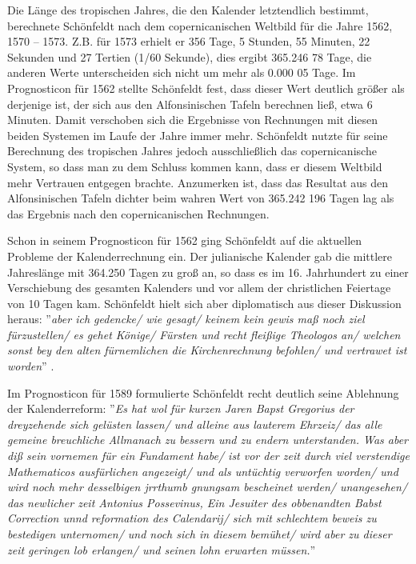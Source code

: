 \documentclass[12pt]{article}
\begin{document}
Die Länge des tropischen Jahres, die den Kalender letztendlich bestimmt, berechnete Schönfeldt nach dem copernicanischen Weltbild für die Jahre 1562, 1570 -- 1573. Z.B. für 1573 erhielt er 356 Tage, 5 Stunden, 55 Minuten, 22 Sekunden und 27 Tertien (1/60 Sekunde), dies ergibt 365.246 78 Tage, die anderen Werte unterscheiden sich  nicht um mehr als 0.000 05 Tage. Im Prognosticon für 1562 stellte Schönfeldt fest, dass dieser Wert deutlich größer als derjenige ist, der sich aus den Alfonsinischen Tafeln berechnen ließ, etwa 6 Minuten. Damit verschoben sich die Ergebnisse von Rechnungen mit diesen beiden Systemen im Laufe der Jahre immer mehr. Schönfeldt nutzte für seine Berechnung des tropischen Jahres jedoch ausschließlich das copernicanische System, so dass man zu dem Schluss kommen kann, dass er diesem Weltbild mehr Vertrauen entgegen brachte. Anzumerken ist, dass das Resultat aus den Alfonsinischen Tafeln dichter beim wahren Wert von 365.242 196 Tagen lag als das Ergebnis nach den copernicanischen Rechnungen.


Schon in seinem Prognosticon für 1562 ging Schönfeldt auf die aktuellen Probleme der Kalenderrechnung ein. Der julianische Kalender gab die mittlere Jahreslänge mit 364.250 Tagen zu groß an, so dass es im 16. Jahrhundert zu einer Verschiebung des gesamten Kalenders und vor allem der christlichen Feiertage von 10 Tagen kam. Schönfeldt hielt sich aber diplomatisch aus dieser Diskussion heraus: ''\emph{aber ich gedencke/ wie gesagt/ keinem kein gewis maß noch ziel fürzustellen/ es gehet Könige/ Fürsten und recht fleißige Theologos an/ welchen sonst bey den alten fürnemlichen die Kirchenrechnung befohlen/ und vertrawet ist worden}'' \cite{Schoenfeldt1561}.

Im Prognosticon für 1589 formulierte Schönfeldt recht deutlich seine Ablehnung der Kalenderreform: ''\emph{Es hat wol für kurzen Jaren Bapst Gregorius der dreyzehende sich gelüsten lassen/ und alleine aus lauterem Ehrzeiz/ das alle gemeine breuchliche Allmanach zu bessern und zu endern unterstanden. Was aber diß sein vornemen für ein Fundament habe/ ist vor der zeit durch viel verstendige Mathematicos ausfürlichen angezeigt/ und als untüchtig verworfen worden/ und wird noch mehr desselbigen jrrthumb gnungsam bescheinet werden/ unangesehen/ das newlicher zeit Antonius Possevinus, Ein Jesuiter des obbenandten Babst Correction unnd reformation des Calendarij/ sich mit schlechtem beweis zu bestedigen unternomen/ und noch sich in diesem bemühet/ wird aber zu dieser zeit geringen lob erlangen/ und seinen lohn erwarten müssen.}''
\end{document}
